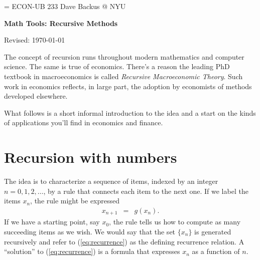 \documentclass[11pt]{article}
\begin{document}
\parskip=\bigskipamount
\parindent=0.0in
\thispagestyle{empty}
{\large ECON-UB 233 \hfill Dave Backus @ NYU}

\bigskip\bigskip
\centerline{\Large \bf Math Tools:  Recursive Methods}
\centerline{Revised: \today}

\bigskip
The concept of recursion runs throughout modern mathematics and computer science.
The same is true of economics.
There's a reason the leading PhD textbook in macroeconomics
is called {\it Recursive Macroeconomic Theory\/}.
Such work in economics reflects, in large part, the adoption by economists of methods
developed elsewhere.

What follows is a short informal introduction to the idea and a start
on the kinds of applications you'll find in economics and finance.


\section{Recursion with numbers}

The idea is to characterize a sequence of items, indexed by an integer $n=0,1,2,\ldots$,
by a rule that connects each item to the next one.
If we label the items $x_n$, the rule might be expressed
\begin{eqnarray}
    x_{n+1} &=& g (x_n) .
    \label{eq:recurrence}
\end{eqnarray}
If we have a starting point, say $x_0$, the rule tells us how to compute
as many succeeding items as we wish.
We would say that the set $\{x_n\}$ is generated recursively
and refer to (\ref{eq:recurrence}) as the defining recurrence relation.
A ``solution'' to (\ref{eq:recurrence}) is a formula
that expresses $x_n$ as a function of $n$.
\end{document}
